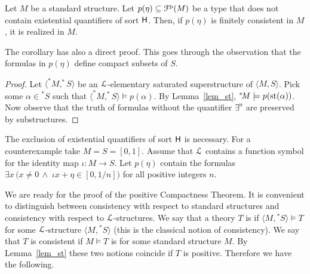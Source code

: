 \documentclass{amsproc}
\renewcommand*{\emph}[1]{%
   \smash{\tikz[baseline]\node[rectangle, fill=teal!25, rounded corners, inner xsep=0.5ex, inner ysep=0.2ex, anchor=base, minimum height = 2.7ex]{\strut #1};}}
\begin{document}
\begin{corollary}\label{corol_st}
  Let $M$ be a standard structure.
  Let $p(\eta)\subseteq{\EuScript F}^{\rm p}(M)$ be a type that does not contain existential quantifiers of sort ${\sf H}$.
  Then, if $p(\eta)$ is finitely consistent in $M$, it is realized in $M$.
 \end{corollary}
 
 The corollary has also a direct proof.
 This goes through the observation that the formulas in $p(\eta)$ define compact subsets of $S$.

 \begin{proof}
  Let $\langle ^*\!M,^*\!\!S\rangle$ be an ${\EuScript L}$-elementary saturated superstructure of $\langle M,S\rangle$.
  Pick some $\alpha\in{}^*\!\!S$ such that $\langle ^*\!M,^*\!\!S\rangle\models p(\alpha)$.
  By Lemma~\ref{lem_st}, $^*\!M\models p({\rm st}(\alpha))$.
  Now observe that the truth of formulas without the quantifier $\exists\raisebox{1.1ex}{\scaleto{\sf H}{.8ex}}$ are preserved by substructures.
 \end{proof}
 
 The exclusion of existential quantifiers of sort ${\sf H}$ is necessary.
 For a counterexample take $M=S=[0,1]$.
 Assume that ${\EuScript L}$ contains a function symbol for the identity map $\iota:M\to S$.
 Let $p(\eta)$ contain the formulas $\exists x\,\big(x\neq0\,\wedge\;\iota x+\eta\in[0,1/n]\big)$ for all positive integers $n$.




We are ready for the proof of the positive Compactness Theorem.
It is convenient to distinguish between consistency with respect to standard structures and consistency with respect to ${\EuScript L}$-structures.
We say that a theory $T$ is \emph{${\EuScript L}$-consistent\/} if $\langle M,{}^*\!\!S\rangle\models T$ for some ${\EuScript L}$-structure $\langle M,{}^*\!\!S\rangle$ (this is the classical notion of consistency).
We say that $T$ is \emph{standardly\/}  consistent if $M\models T$  is for some standard structure $M$.
By Lemma~\ref{lem_st} these two notions coincide if $T$ is positive.
Therefore we have the following.
\end{document}
